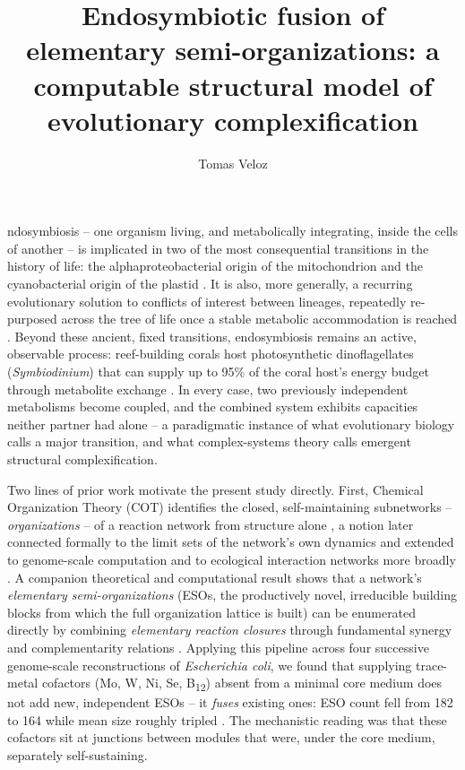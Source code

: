 \documentclass[9pt,twocolumn,twoside]{pnas-new}
\title{Endosymbiotic fusion of elementary semi-organizations: a computable structural model of evolutionary complexification}
\author[a,1]{Tomas Veloz}
\affil[a]{Fundaci\'on para el Desarrollo Interdisciplinario de la Ciencia, la Tecnolog\'ia y las Artes, Santiago, Chile}
\begin{document}
\maketitle
\thispagestyle{firststyle}

ndosymbiosis -- one organism living, and metabolically integrating, inside the cells of another -- is implicated in two of the most consequential transitions in the history of life: the alphaproteobacterial origin of the mitochondrion and the cyanobacterial origin of the plastid \cite{archibald2015}. It is also, more generally, a recurring evolutionary solution to conflicts of interest between lineages, repeatedly re-purposed across the tree of life once a stable metabolic accommodation is reached \cite{wernegreen2004}. Beyond these ancient, fixed transitions, endosymbiosis remains an active, observable process: reef-building corals host photosynthetic dinoflagellates (\textit{Symbiodinium}) that can supply up to 95\% of the coral host's energy budget through metabolite exchange \cite{velozflores2021}. In every case, two previously independent metabolisms become coupled, and the combined system exhibits capacities neither partner had alone -- a paradigmatic instance of what evolutionary biology calls a major transition, and what complex-systems theory calls emergent structural complexification.

Two lines of prior work motivate the present study directly. First, Chemical Organization Theory (COT) identifies the closed, self-maintaining subnetworks -- \emph{organizations} -- of a reaction network from structure alone \cite{seminal}, a notion later connected formally to the limit sets of the network's own dynamics \cite{peterdittrich2011} and extended to genome-scale computation \cite{centler2008computing} and to ecological interaction networks more broadly \cite{velozfoundations2019}. A companion theoretical and computational result shows that a network's \emph{elementary semi-organizations} (ESOs, the productively novel, irreducible building blocks from which the full organization lattice is built) can be enumerated directly by combining \emph{elementary reaction closures} through fundamental synergy and complementarity relations \cite{velozbassi}. Applying this pipeline across four successive genome-scale reconstructions of \textit{Escherichia coli}, we found that supplying trace-metal cofactors (Mo, W, Ni, Se, B\textsubscript{12}) absent from a minimal core medium does not add new, independent ESOs -- it \emph{fuses} existing ones: ESO count fell from 182 to 164 while mean size roughly tripled \cite{velozecoli2026}. The mechanistic reading was that these cofactors sit at junctions between modules that were, under the core medium, separately self-sustaining.
\end{document}
